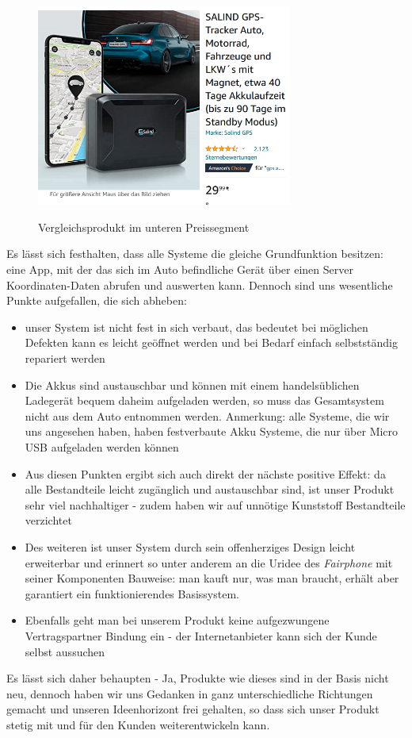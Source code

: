\begin{figure} [H]
	\begin{center}
		\includegraphics[width=0.75\textwidth]{Bilder/Produkt_Vergleich.png}
		\caption{Vergleichsprodukt im unteren Preissegment}
		\cite{Salind}
		\label{product_vgl}
	\end{center}
\end{figure}

Es lässt sich festhalten, dass alle Systeme die gleiche Grundfunktion besitzen: eine App, mit der das sich im Auto befindliche Gerät über einen Server Koordinaten-Daten abrufen und auswerten kann. Dennoch sind uns wesentliche Punkte aufgefallen, die sich abheben:

\begin{itemize}
	\item unser System ist nicht fest in sich verbaut, das bedeutet bei möglichen Defekten kann es leicht geöffnet werden und bei Bedarf einfach selbstständig repariert werden
	\item Die Akkus sind austauschbar und können mit einem handelsüblichen Ladegerät bequem daheim aufgeladen werden, so muss das Gesamtsystem nicht aus dem Auto entnommen werden. Anmerkung: alle Systeme, die wir uns angesehen haben, haben festverbaute Akku Systeme, die nur über Micro USB aufgeladen werden können
	\item Aus diesen Punkten ergibt sich auch direkt der nächste positive Effekt: da alle Bestandteile leicht zugänglich und austauschbar sind, ist unser Produkt sehr viel nachhaltiger - zudem haben wir auf unnötige Kunststoff Bestandteile verzichtet
	\item Des weiteren ist unser System durch sein offenherziges Design leicht erweiterbar und erinnert so unter anderem an die Uridee des \textit{Fairphone} mit seiner Komponenten Bauweise: man kauft nur, was man braucht, erhält aber garantiert ein funktionierendes Basissystem.
	\item Ebenfalls geht man bei unserem Produkt keine aufgezwungene Vertragspartner Bindung ein - der Internetanbieter kann sich der Kunde selbst aussuchen
\end{itemize}
Es lässt sich daher behaupten - Ja, Produkte wie dieses sind in der Basis nicht neu, dennoch haben wir uns Gedanken in ganz unterschiedliche Richtungen gemacht und unseren Ideenhorizont frei gehalten, so dass sich unser Produkt stetig mit und für den Kunden weiterentwickeln kann.
